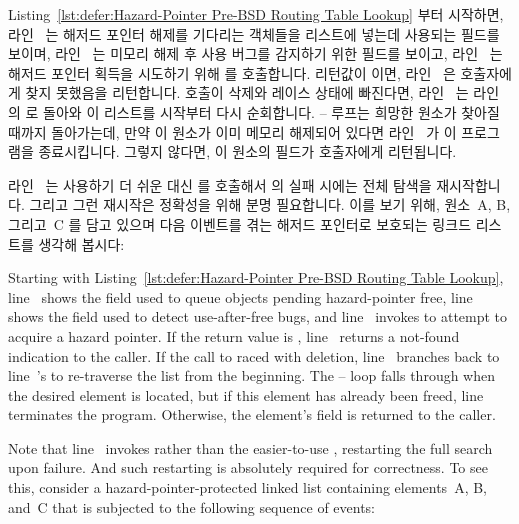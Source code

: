 \begin{fcvref}
Listing~\ref{lst:defer:Hazard-Pointer Pre-BSD Routing Table Lookup}
부터 시작하면, 라인~ 는 해저드 포인터 해제를 기다리는 객체들을
리스트에 넣는데 사용되는  필드를 보이며, 라인~ 는
미모리 해제 후 사용 버그를 감지하기 위한  필드를 보이고,
라인~ 는 해저드 포인터 획득을 시도하기 위해
 를 호출합니다.
리턴값이  이면, 라인~ 은 호출자에게 찾지 못했음을
리턴합니다.
 호출이 삭제와 레이스 상태에 빠진다면, 라인~
는 라인~ 의  로 돌아와 이 리스트를 시작부터 다시
순회합니다.
-- 루프는 희망한 원소가 찾아질 때까지 돌아가는데, 만약 이
원소가 이미 메모리 해제되어 있다면 라인~ 가 이 프로그램을
종료시킵니다.
그렇지 않다면, 이 원소의  필드가 호출자에게 리턴됩니다.

라인~ 는 사용하기 더 쉬운  대신
 를 호출해서  의 실패 시에는 전체
탐색을 재시작합니다.
그리고 그런 재시작은 정확성을 위해 분명 필요합니다.
이를 보기 위해, 원소~A, B, 그리고~C 를 담고 있으며 다음 이벤트를 겪는 해저드
포인터로 보호되는 링크드 리스트를 생각해 봅시다:
\end{fcvref}

\iffalse

\begin{fcvref}
Starting with
Listing~\ref{lst:defer:Hazard-Pointer Pre-BSD Routing Table Lookup},
line~ shows the  field used to queue objects pending
hazard-pointer free,
line~ shows the  field used to detect
use-after-free bugs, and line~ invokes
 to attempt to acquire a hazard pointer.
If the return value is , line~ returns a not-found
indication to the caller.
If the call to  raced with deletion, line~
branches back to line~'s  to re-traverse the list
from the beginning.
The -- loop falls through when the desired element is
located, but if this element has already been freed, line~
terminates the program.
Otherwise, the element's  field is returned to the caller.

Note that line~ invokes  rather
than the easier-to-use , restarting the full search
upon  failure.
And such restarting is absolutely required for correctness.  To see this,
consider a hazard-pointer-protected linked list containing elements~A,
B, and~C that is subjected to the following sequence of events:
\end{fcvref}

